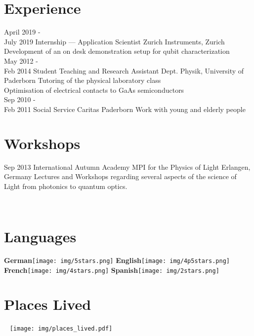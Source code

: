 \documentclass[10pt, print]{friggeri-cv}
\begin{document}
\section{Experience}
\begin{entrylist}
	\entry
	{April 2019 -\\ July 2019}
	{Internship — Application Scientist}
	{Zurich Instruments, Zurich}
	{Development of an on desk demonstration setup for qubit characterization\\}
	\entry
	{May 2012 -\\ Feb 2014}
	{Student Teaching and Research Assistant}
	{Dept. Physik,  University of Paderborn}
	{Tutoring of the physical laboratory class\\Optimisation of electrical contacts to GaAs semiconductors\\}
	\entry
	{Sep 2010 -\\ Feb 2011}
	{Social Service}
	{Caritas Paderborn}
	{Work with young and elderly people }
\end{entrylist}

\section{Workshops}
\begin{entrylist}
	\entry
	{Sep 2013}
	{International Autumn Academy}
	{MPI for the Physics of Light Erlangen, Germany}
	{Lectures and Workshops regarding several aspects of the science of Light from photonics to quantum optics.}
\end{entrylist}


\newpage

\begin{aside}
~
~
~
  \section{Languages}
      \textbf{German}\texttt{[image: img/5stars.png]}
      \textbf{English}\texttt{[image: img/4p5stars.png]}
      \textbf{French}\texttt{[image: img/4stars.png]}
      \textbf{Spanish}\texttt{[image: img/2stars.png]}
~
	\section{Places Lived}
	~
	\texttt{[image: img/places\_lived.pdf]}
	      ~
\end{aside}
\end{document}
